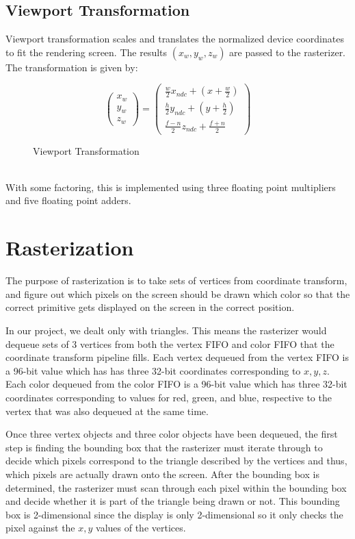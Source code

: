 \documentclass[letterpaper,10pt]{article}
\begin{document}
\subsection{Viewport Transformation}
Viewport transformation scales and translates the normalized device coordinates to fit the rendering screen. The results $(x_{w},y_{w},z_{w})$ are passed to the rasterizer. The transformation is given by: \\
\begin{figure}[h!]
\[
\begin{pmatrix}
x_{w} \\
y_{w} \\
z_{w}
\end{pmatrix}
=
\begin{pmatrix}
\frac{w}{2}x_{ndc}+(x+\frac{w}{2}) \\
\frac{h}{2}y_{ndc}+(y+\frac{h}{2})  \\
\frac{f-n}{2}z_{ndc}+\frac{f+n}{2}
\end{pmatrix}
\]
\caption{Viewport Transformation}
\end{figure}\\	
With some factoring, this is implemented using three floating point multipliers and five floating point adders.


\section{Rasterization}

The purpose of rasterization is to take sets of vertices from coordinate transform, and figure out which pixels on the screen should be drawn which color so that the correct primitive gets displayed on the screen in the correct position. 

In our project, we dealt only with triangles. This means the rasterizer would dequeue sets of 3 vertices from both the vertex FIFO and color FIFO that the coordinate transform pipeline fills. Each vertex dequeued from the vertex FIFO is a 96-bit value which has has three 32-bit coordinates corresponding to $x, y, z$. Each color dequeued from the color FIFO is a 96-bit value which has three 32-bit coordinates corresponding to values for red, green, and blue, respective to the vertex that was also dequeued at the same time.

Once three vertex objects and three color objects have been dequeued, the first step is finding the bounding box that the rasterizer must iterate through to decide which pixels correspond to the triangle described by the vertices and thus, which pixels are actually drawn onto the screen. After the bounding box is determined, the rasterizer must scan through each pixel within the bounding box and decide whether it is part of the triangle being drawn or not. This bounding box is 2-dimensional since the display is only 2-dimensional so it only checks the pixel against the $x, y$ values of the vertices. 
\end{document}
